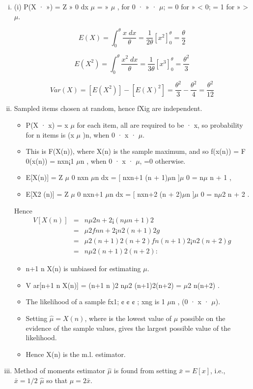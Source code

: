 \documentclass[a4paper,12pt]{article}
\begin{document}
\begin{enumerate}[(i)]
\item (i) P(X · ») =
Z »
0
dx
$\mu$
= »
$\mu$
, for 0 · » · $\mu$; = 0 for » < 0; = 1 for » > $\mu$.

\[E(X) = \int^{\theta}_{0} \frac{x\;dx}{\theta} = \frac{1}{2\theta}\left[ x^2 \right]^{\theta}_{0} = \frac{\theta}{2}\]



\[E(X^2) = \int^{\theta}_{0} \frac{x^2\;dx}{\theta} = \frac{1}{3\theta}\left[ x^3 \right]^{\theta}_{0} = \frac{\theta^2}{3}\]

\[ Var(X) = [E(X^2)] - [E(X)^2] = \frac{\theta^2}{3} - \frac{\theta^2}{4} = \frac{\theta^2}{12}\]
\item Sampled items chosen at random, hence fXig are independent. 
\begin{itemize}
\item P(X · x) =
x
$\mu$ for each item, all are required to be · x, so probability for n items is (x
$\mu$ )n,
when 0 · x · $\mu$. 
\item This is F(X(n)), where X(n) is the sample maximum, and
so f(x(n)) = F
0(x(n)) = nxn¡1
$\mu$n , when 0 · x · $\mu$, =0 otherwise.
\item E[X(n)] =
Z $\mu$
0
nxn
$\mu$n dx = [ nxn+1
(n + 1)$\mu$n ]$\mu$
0 = n$\mu$
n + 1
,
\item E[X2
(n)] =
Z $\mu$
0
nxn+1
$\mu$n dx = [ nxn+2
(n + 2)$\mu$n ]$\mu$
0 = n$\mu$2
n + 2
.

\end{itemize}
Hence
\begin{eqnarray*}
V [X(n)] &=& n\mu2
n+2 ¡ ( n\mu
n+1)2\\ &=& \mu2f n
n+2 ¡ n2
(n+1)2 g\\
&=& \mu2
(n+1)2(n+2)fn(n + 1)2 ¡ n2(n + 2)g \\ &=& 
n \mu 2
(n+1)2(n+2) :
\end{eqnarray*}

\begin{itemize}
\item n+1
n X(n) is unbiased for estimating $\mu$.
\item V ar[n+1
n X(n)] = (n+1
n )2 n$\mu$2
(n+1)2(n+2) = $\mu$2
n(n+2) .
\item The likelihood of a sample fx1; ¢ ¢ ¢ ; xng is 1
$\mu$n , (0 · x · $\mu$).
\item Setting $\hat{\mu} = X(n)$, where is the lowest value of $\mu$ possible on the evidence of
the sample values, gives the largest possible value of the likelihood.
\item  Hence X(n) is the m.l. estimator.
\end{itemize}
\item Method of moments estimator $\hat{\mu}$ is found from setting $\bar{x} = E[x]$, i.e., $\bar{x} = 1/2$
$\hat{\mu}$
so that $\hat{\mu} = 2\bar{x}$. 


\end{enumerate}
\end{document}
